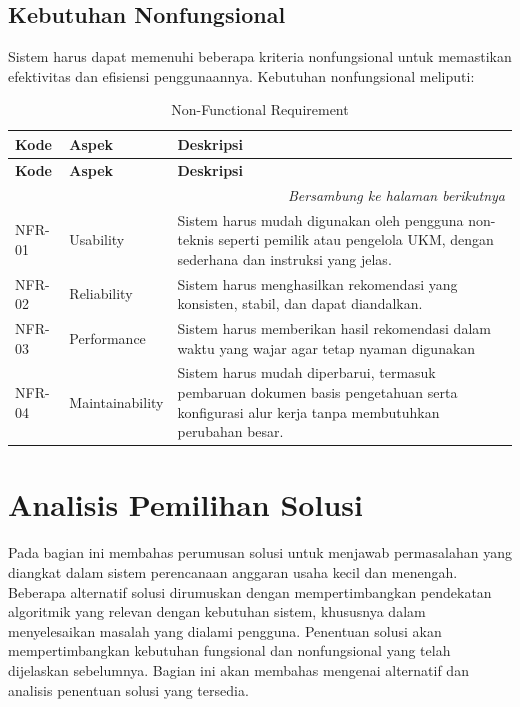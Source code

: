 \subsection{Kebutuhan Nonfungsional}
Sistem harus dapat memenuhi beberapa kriteria nonfungsional untuk memastikan efektivitas dan efisiensi penggunaannya. Kebutuhan nonfungsional meliputi:

\begin{longtable}{|p{3cm}|p{5cm}|p{5cm}|}
\caption{Non-Functional Requirement}
\label{tbl:Non-Functional Req} \\
\hline
\textbf{Kode} &  \textbf{Aspek} &  \textbf{Deskripsi}\\
\hline
\endfirsthead

\hline
\textbf{Kode} &  \textbf{Aspek} &  \textbf{Deskripsi}\\
\hline
\endhead

\hline
\multicolumn{3}{r}{\textit{Bersambung ke halaman berikutnya}} \\
\endfoot

\hline
\endlastfoot

NFR-01
&
Usability
&
Sistem harus mudah digunakan oleh pengguna non-teknis seperti pemilik atau pengelola UKM, dengan sederhana dan instruksi yang jelas.
\\ \hline

NFR-02
&
Reliability
&
Sistem harus menghasilkan rekomendasi yang konsisten, stabil, dan dapat diandalkan.
\\ \hline

NFR-03
&
Performance
&
Sistem harus memberikan hasil rekomendasi dalam waktu yang wajar agar tetap nyaman digunakan
\\ \hline

NFR-04
&
Maintainability
&
Sistem harus mudah diperbarui, termasuk pembaruan dokumen basis pengetahuan serta konfigurasi alur kerja tanpa membutuhkan perubahan besar.
\\ \hline
\end{longtable}

\section{Analisis Pemilihan Solusi}
Pada bagian ini membahas perumusan solusi untuk menjawab permasalahan yang
diangkat dalam sistem perencanaan anggaran usaha kecil dan menengah. Beberapa
alternatif solusi dirumuskan dengan mempertimbangkan pendekatan algoritmik
yang relevan dengan kebutuhan sistem, khususnya dalam menyelesaikan masalah yang dialami pengguna. 
Penentuan solusi akan mempertimbangkan kebutuhan fungsional dan nonfungsional yang telah dijelaskan
sebelumnya. Bagian ini akan membahas mengenai alternatif dan analisis penentuan solusi yang tersedia.

